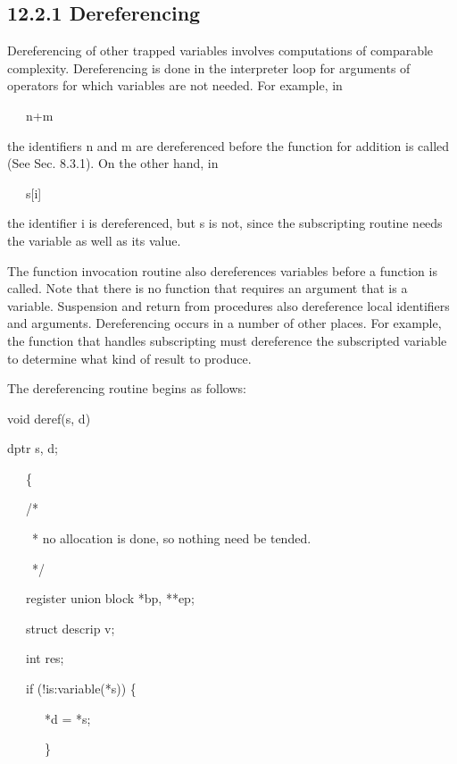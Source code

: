 \subsection[12.2.1 Dereferencing]{12.2.1 Dereferencing}

Dereferencing of other trapped variables involves computations of
comparable complexity. Dereferencing is done in the interpreter loop
for arguments of operators for which variables are not needed. For
example, in

{\ttfamily\mdseries
\ \ \ n+m}

\noindent the identifiers n and m are dereferenced before the function
for addition is called (See Sec. 8.3.1). On the other hand, in

{\ttfamily\mdseries
\ \ \ s[i]}

\noindent the identifier i is dereferenced, but s is not, since the
subscripting routine needs the variable as well as its value.

The function invocation routine also dereferences variables before a
function is called. Note that there is no function that requires an
argument that is a variable. Suspension and return from procedures
also dereference local identifiers and arguments. Dereferencing occurs
in a number of other places. For example, the function that handles
subscripting must dereference the subscripted variable to determine
what kind of result to produce.

The dereferencing routine begins as follows:

{\ttfamily\mdseries
void deref(s, d)}

{\ttfamily\mdseries
dptr s, d;}

{\ttfamily\mdseries
\ \ \ \{}

{\ttfamily\mdseries
\ \ \ /*}

{\ttfamily\mdseries
\ \ \ \ * no allocation is done, so nothing need be tended.}

{\ttfamily\mdseries
\ \ \ \ */}

{\ttfamily\mdseries
\ \ \ register union block *bp, **ep;}

{\ttfamily\mdseries
\ \ \ struct descrip v;}

{\ttfamily\mdseries
\ \ \ int res;}


\bigskip

{\ttfamily\mdseries
\ \ \ if (!is:variable(*s)) \{}

{\ttfamily\mdseries
\ \ \ \ \ \ *d = *s;}

{\ttfamily\mdseries
\ \ \ \ \ \ \}}

